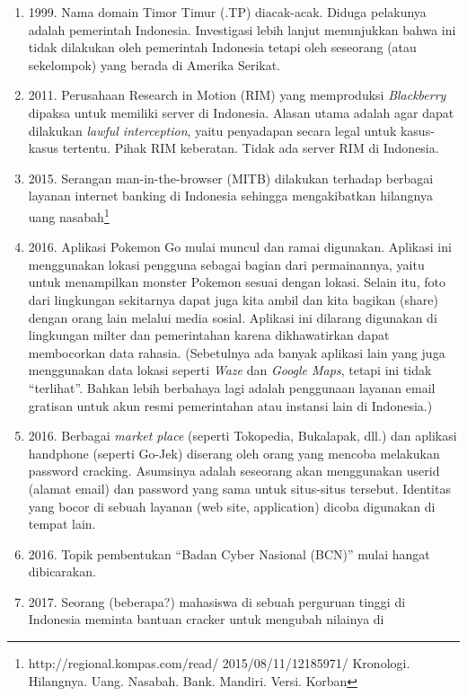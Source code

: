 \begin{enumerate}
\item 1999. Nama domain Timor Timur (.TP) diacak-acak.
   Diduga pelakunya adalah pemerintah Indonesia.
   Investigasi lebih lanjut menunjukkan bahwa ini tidak dilakukan
   oleh pemerintah Indonesia tetapi oleh seseorang (atau sekelompok)
   yang berada di Amerika Serikat.
\item 2011. Perusahaan Research in Motion (RIM) yang memproduksi
   {\em Blackberry} dipaksa untuk memiliki server di Indonesia.
   Alasan utama adalah agar dapat dilakukan {\em lawful interception},
   yaitu penyadapan secara legal untuk kasus-kasus tertentu.
   Pihak RIM keberatan. Tidak ada server RIM di Indonesia.
\item 2015. Serangan man-in-the-browser (MITB) dilakukan terhadap
   berbagai layanan internet banking di Indonesia sehingga mengakibatkan
   hilangnya uang nasabah\footnote{http://regional.kompas.com/read/
   2015/08/11/12185971/
   Kronologi. Hilangnya. Uang. Nasabah. Bank. Mandiri.
   Versi. Korban}
\item 2016. Aplikasi Pokemon Go mulai muncul dan ramai digunakan.
   Aplikasi ini menggunakan lokasi pengguna sebagai bagian dari
   permainannya, yaitu untuk menampilkan monster Pokemon sesuai
   dengan lokasi.
   Selain itu, foto dari lingkungan sekitarnya dapat juga kita ambil
   dan kita bagikan (share) dengan orang lain melalui media sosial.
   Aplikasi ini dilarang digunakan di lingkungan milter dan
   pemerintahan karena dikhawatirkan dapat membocorkan data rahasia.
   (Sebetulnya ada banyak aplikasi lain yang juga menggunakan data
   lokasi seperti {\em Waze} dan {\em Google Maps}, tetapi ini tidak
   ``terlihat''. Bahkan lebih berbahaya lagi adalah penggunaan
   layanan email gratisan untuk akun resmi pemerintahan atau instansi
   lain di Indonesia.)
\item 2016.
   Berbagai {\em market place} (seperti Tokopedia, Bukalapak, dll.)
   dan aplikasi handphone (seperti Go-Jek) diserang oleh orang
   yang mencoba melakukan password cracking.
   Asumsinya adalah seseorang akan menggunakan userid (alamat email)
   dan password yang sama untuk situs-situs tersebut.
   Identitas yang bocor di sebuah layanan (web site, application)
   dicoba digunakan di tempat lain. 
\item 2016. Topik pembentukan ``Badan Cyber Nasional (BCN)''
   mulai hangat dibicarakan.
\item 2017. Seorang (beberapa?) mahasiswa di sebuah perguruan tinggi
   di Indonesia meminta bantuan cracker untuk mengubah nilainya di

\end{enumerate}
